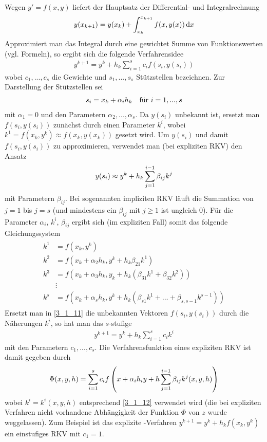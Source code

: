 Wegen $y'=f(x,y)$ liefert der Hauptsatz der Differential- und Integralrechnung
\begin{align}
	\label{3_1_10}
	y(x_{k+1}) = y(x_k) + \int_{x_k}^{x_{k+1}} f(x,y(x))\,\mathrm{d} x
\end{align}
Approximiert man das Integral durch eine gewichtet Summe von Funktionswerten (vgl.  Formeln), so ergibt sich die folgende Verfahrensidee
\begin{align}
	\label{3_1_11}
	y^{k+1} = y^k + h_k\sum_{i=1}^s c_if(s_i,y(s_i))
\end{align}
wobei $c_1,...,c_s$ die Gewichte und $s_1,...,s_s$ Stützstellen bezeichnen. Zur Darstellung der Stützstellen sei
\begin{align}
	s_i = x_k + \alpha_ih_k\quad\text{für } i=1,...,s\notag
\end{align}
mit $\alpha_1=0$ und den Parametern $\alpha_2,...,\alpha_s$. Da $y(s_i)$ unbekannt ist, ersetzt man $f(s_i,y(s_i))$ zunächst durch einen Parameter $k^i$, wobei $k^1=f(x_k,y^k)\approx f(x_k,y(x_k))$ gesetzt wird. Um $y(s_i)$ und damit $f(s_i,y(s_i))$ zu approximieren, verwendet man (bei expliziten RKV) den Ansatz
\begin{align}
	y(s_i) \approx y^k + h_k\sum_{j=1}^{i-1} \beta_{ij}k^j\notag
\end{align}
mit Parametern $\beta_{ij}$. Bei sogenannten impliziten RKV läuft die Summation von $j=1$ bis $j=s$ (und mindestens ein $\beta_{ij}$ mit $j\ge 1$ ist ungleich 0). Für die Parameter $\alpha_i$, $k^i$, $\beta_{ij}$ ergibt sich (im expliziten Fall) somit das folgende Gleichungssystem
\begin{align}
	\label{3_1_12}
	\begin{split}
		k^1 &= f(x_k,y^k) \\
		k^2 &= f(x_k+\alpha_2h_k,y^k+h_k\beta_{21}k^1) \\
		k^3 &= f(x_k+\alpha_3h_k,y_k+h_k(\beta_{31}k^1 + \beta_{32}k^2)) \\
		&\vdots \\
		k^s &= f(x_k+\alpha_sh_k,y^k+h_k(\beta_{s1}k^1+\dots+\beta_{s,s-1}k^{s-1}))
	\end{split}
\end{align}
Ersetzt man in \cref{3_1_11} die unbekannten Vektoren $f(s_i,y(s_i))$ durch die Näherungen $k^i$, so hat man das $s$-stufige 
\begin{align}
	\label{3_1_13}
	y^{k+1} = y^k + h_k\sum_{i=1}^s c_ik^i
\end{align}
mit den Parametern $c_1,...,c_s$. Die Verfahrensfunktion eines expliziten RKV ist damit gegeben durch 
\begin{align}
	\Phi(x,y,h) = \sum_{i=1}^s c_if\left(x+\alpha_ih_iy+h\sum_{j=1}^{i-1}\beta_{ij}k^j(x,y,h)\right) \notag
\end{align}
wobei $k^i=k^i(x,y,h)$ entsprechend \cref{3_1_12} verwendet wird (die bei expliziten Verfahren nicht vorhandene Abhängigkeit der Funktion $\Phi$ von $z$ wurde weggelassen). Zum Beispiel ist das explizite -Verfahren $y^{k+1}=y^k+h_kf(x_k,y^k)$ ein einstufiges RKV mit $c_1=1$.

